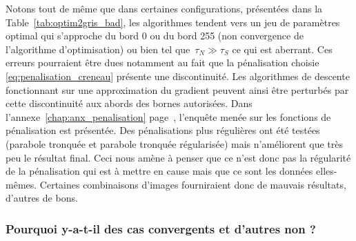 \documentclass[main.tex]{subfiles}
\begin{document}
Notons tout de même que dans certaines configurations, présentées dans la Table~\ref{tab:optim2gris_bad}, les algorithmes tendent vers un jeu de paramètres optimal qui s'approche du bord 0 ou du bord 255 %
(\ie non convergence de l'algorithme d'optimisation) %
ou bien tel que~$\tau_N{\gg}\tau_S$ ce qui est aberrant. 
Ces erreurs pourraient être dues notamment au fait que la pénalisation choisie \eqref{eq:penalisation_creneau} présente une discontinuité. 
Les algorithmes de descente fonctionnant sur une approximation du gradient peuvent ainsi être perturbés par cette discontinuité aux abords des bornes autorisées. Dans l'annexe~\ref{chap:anx_penalisation} page~\pageref{chap:anx_penalisation}, l'enquête menée sur les fonctions de pénalisation est présentée. 
Des pénalisations plus régulières ont été testées (parabole tronquée et parabole tronquée régularisée) mais n'améliorent que très peu le résultat final. Ceci nous amène à penser que ce n'est donc pas la régularité de la pénalisation qui est à mettre en cause mais que ce sont les données elles-mêmes. 
Certaines combinaisons d'images fourniraient donc de mauvais résultats, d'autres de bons.  


\subsubsection*{Pourquoi y-a-t-il des cas convergents et d'autres non ?\label{subsec:pb_condi}}



\end{document}
